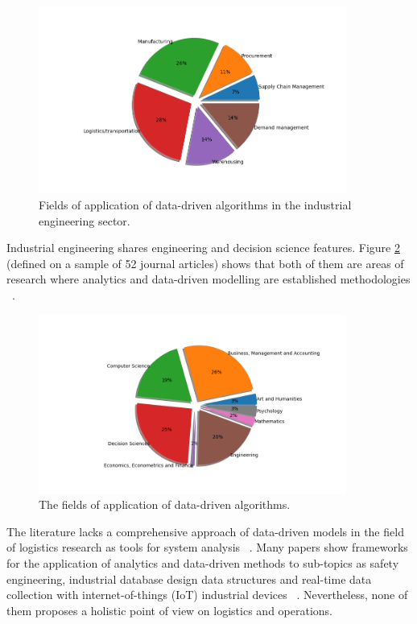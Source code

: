 \begin{figure}[hbt!]
\centering
\includegraphics[width=0.9\textwidth]{SectionIntroduction/researchBackground_figures/fig_literature_pie.png}
\captionsetup{type=figure}
\caption{Fields of application of data-driven algorithms in the industrial engineering sector.}
\label{fig_literature_pie}
\end{figure}

Industrial engineering shares engineering and decision science features. Figure \ref{fig_topics_pie} (defined on a sample of 52 journal articles) shows that both of them are areas of research where analytics and data-driven modelling are established methodologies ~\cite{Gupta2019}.

\begin{figure}[hbt!]
\centering
\includegraphics[width=0.9\textwidth]{SectionIntroduction/researchBackground_figures/fig_topics_pie.png}
\captionsetup{type=figure}
\caption{The fields of application of data-driven algorithms.}
\label{fig_topics_pie}
\end{figure}

The literature lacks a comprehensive approach of data-driven models in the field of logistics research as tools for system analysis ~\cite{Wang2016, Lamba2018}. Many papers show frameworks for the application of analytics and data-driven methods to sub-topics as safety engineering, industrial database design data structures and real-time data collection with internet-of-things (IoT) industrial devices ~\cite{Huang2018, Zhang2018}. Nevertheless, none of them proposes a holistic point of view on logistics and operations.\par

